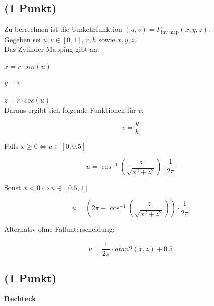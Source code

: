 \documentclass[a4paper,10pt,DIV=14]{article}
\begin{document}
\subsection{(1 Punkt)} %


Zu berrechnen ist die Umkehrfunktion $(u,v) = F_{\text{inv map}}(x,y,z)$.\\

Gegeben sei $u,v \in [0,1]$, $r, h$ sowie $x,y,z$.\\

Das Zylinder-Mapping gibt an:

$x = r \cdot sin(u)$

$y = v$

$z = r \cdot cos(u)$\\

Daraus ergibt sich folgende Funktionen für $v$:

\[v = \frac{y}{h}\]

Falls $x \geq 0 \Leftrightarrow u \in [0,0.5]$

\[u = \cos^{-1}(\frac{z}{\sqrt{x^2+z^2}}) \cdot \frac{1}{2\pi}\]

Sonst $x < 0 \Leftrightarrow u \in [0.5, 1]$

\[u = (2\pi - \cos^{-1}(\frac{z}{\sqrt{x^2+z^2}})) \cdot \frac{1}{2\pi}\]

Alternativ ohne Fallunterscheidung:

\[u = \frac{1}{2\pi} \cdot atan2(x,z) + 0.5\]


\subsection{(1 Punkt)} %


\textbf{Rechteck}\\

\end{document}
